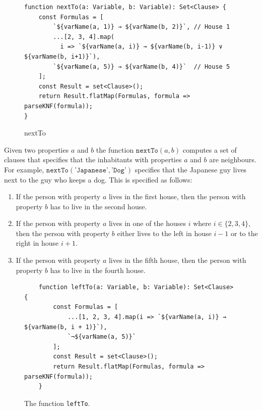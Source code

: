 \begin{figure}[!ht]
\centering
\begin{verbatim}
function nextTo(a: Variable, b: Variable): Set<Clause> {
    const Formulas = [
        `${varName(a, 1)} → ${varName(b, 2)}`, // House 1
        ...[2, 3, 4].map(
          i => `${varName(a, i)} → ${varName(b, i-1)} ∨ ${varName(b, i+1)}`), 
        `${varName(a, 5)} → ${varName(b, 4)}`  // House 5
    ];
    const Result = set<Clause>();
    return Result.flatMap(Formulas, formula => parseKNF(formula));
}
\end{verbatim}
\vspace*{-0.3cm}
\caption{nextTo} %
\label{fig:nextTo}
\end{figure}
Given two properties $a$ and $b$ the function $\texttt{nextTo}(a, b)$ computes a
set of clauses that specifies that the inhabitants with properties $a$ and $b$
are neighbours.  For example, $\texttt{nextTo}(\texttt{'Japanese'}, \texttt{'Dog'})$
specifies that the Japanese guy lives next to the guy who keeps a dog. 
This is specified as follows:
\begin{enumerate}
\item If the person with property $a$ lives in the first house, then the person with property $b$ has to live
      in the second house.
\item If the person with property $a$ lives in one of the houses $i$ where $i \in \{ 2, 3, 4 \}$, then
      the person with property $b$ either lives to the left in house $i-1$ or to the right in house $i+1$.
\item If the person with property $a$ lives in the fifth house, then the person with property $b$ has to live
      in the fourth house.
\end{enumerate}

\begin{figure}[!ht]
\centering
\begin{verbatim}
    function leftTo(a: Variable, b: Variable): Set<Clause> {
        const Formulas = [
            ...[1, 2, 3, 4].map(i => `${varName(a, i)} → ${varName(b, i + 1)}`),
            `¬${varName(a, 5)}`
        ];
        const Result = set<Clause>();
        return Result.flatMap(Formulas, formula => parseKNF(formula));
    }
\end{verbatim}
\vspace*{-0.3cm}
\caption{The function \texttt{leftTo}.} %
\label{fig:leftTo}
\end{figure}

